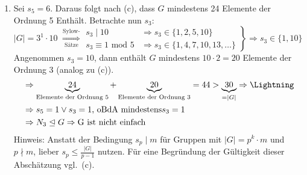 \documentclass[]{scrartcl}
\newcommand{\<}{\trianglelefteq}
\newcommand{\abs}[1]{\vert #1\vert}
\begin{document}
\begin{enumerate}[label=zu (\alph*):]
	\item Sei $s_5=6$. Daraus folgt nach (c), dass $G$ mindestens 24 Elemente der Ordnung 5 Enthält. Betrachte nun $s_3$:\\
	$\abs{G}=3^1\cdot 10$
	$\overset{\text{Sylow-}}{\underset{\text{Sätze}}{\Rightarrow}}\left.
	\begin{array}{rll}
		s_3\mid 10 &\Rightarrow s_3\in \{1,2,5,10\}\\
		s_3\equiv 1\text{ mod }5 &\Rightarrow s_3\in \{1,4,7,10,13,\dots\}
	\end{array}
	\right\}\Rightarrow s_3\in\{1,10\}$\\
	Angenommen $s_3=10$, dann enthält $G$ mindestens $10\cdot 2=20$ Elemente der Ordnung 3 (analog zu (c)).
	\begin{align*}
		&\Rightarrow \underbrace{24}_{\text{Elemente der Ordnung 5}}+\underbrace{20}_{\text{Elemente der Ordnung 3}}=44> \underbrace{30}_{=\abs{G}} \Rightarrow \mbox{\Lightning}\\
		&\Rightarrow s_5=1 \lor s_3=1 \text{, oBdA mindestens} s_3=1 \\
		&\Rightarrow N_3\<G \Rightarrow \text{G ist nicht einfach}
	\end{align*}
	Hinweis: Anstatt der Bedingung $s_p\mid m$ für Gruppen mit $\abs{G}=p^k\cdot m$ und $p\nmid m$, lieber $s_p\le \frac{\abs{G}}{p-1}$ nutzen. Für eine Begründung der Gültigkeit dieser Abschätzung vgl.\ (c).
\end{enumerate}
\end{document}
